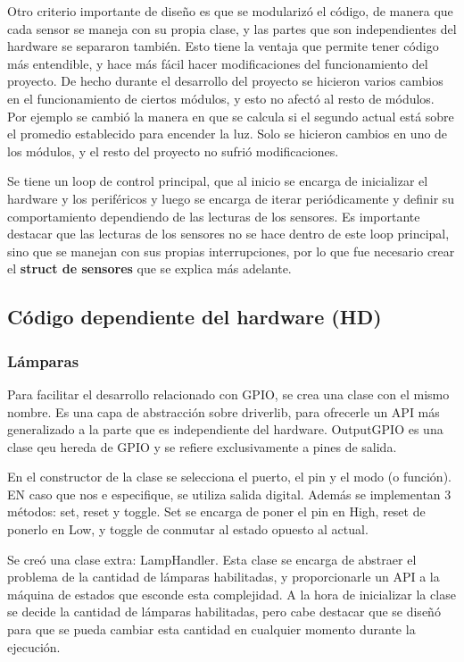 Otro criterio importante de diseño es que se modularizó el código, de manera que cada sensor se
maneja con su propia clase, y las partes que son independientes del hardware se separaron
también. Esto tiene la ventaja que permite tener código más entendible, y hace más fácil hacer
modificaciones del funcionamiento del proyecto. De hecho durante el desarrollo del proyecto se
hicieron varios cambios en el funcionamiento de ciertos módulos, y esto no afectó al resto de
módulos. Por ejemplo se cambió la manera en que se calcula si el segundo actual está sobre el
promedio establecido para encender la luz. Solo se hicieron cambios en uno de los módulos, y el
resto del proyecto no sufrió modificaciones.

Se tiene un loop de control principal, que al inicio se encarga de inicializar el hardware y los
periféricos y luego se encarga de iterar periódicamente y definir su comportamiento dependiendo de
las lecturas de los sensores. Es importante destacar que las lecturas de los sensores no se hace
dentro de este loop principal, sino que se manejan con sus propias interrupciones, por lo que fue
necesario crear el \textbf{struct de sensores} que se explica más adelante. 


\subsection{Código dependiente del hardware (HD)}

\subsubsection{Lámparas}
Para facilitar el desarrollo relacionado con GPIO, se crea una clase con el mismo nombre. Es una
capa de abstracción sobre driverlib, para ofrecerle un API más generalizado a la parte que es
independiente del hardware. OutputGPIO es una clase qeu hereda de GPIO y se refiere exclusivamente a
pines de salida.

En el constructor de la clase  se selecciona el puerto, el pin y el modo (o función). EN caso que
nos e especifique, se utiliza salida digital. Además se implementan 3 métodos: set, reset y
toggle. Set se encarga de poner el pin en High, reset de ponerlo en Low, y toggle de conmutar al
estado opuesto al actual.

Se creó una clase extra: LampHandler. Esta clase se encarga de abstraer el problema de la cantidad
de lámparas habilitadas, y proporcionarle un API a la máquina de estados que esconde esta
complejidad. A la hora de inicializar la clase se decide la cantidad de lámparas habilitadas, pero
cabe destacar que se diseñó para que se pueda cambiar esta cantidad en cualquier momento durante la
ejecución.

